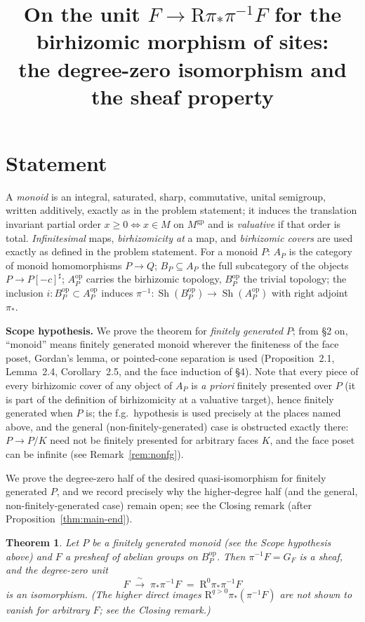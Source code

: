 \documentclass[11pt]{article}
\title{On the unit $F\to\mathrm{R}\pi_{*}\pi^{-1}F$ for the
birhizomic morphism of sites:\\
the degree-zero isomorphism and the sheaf property}
\author{}
\date{}
\newtheorem{theorem}{Theorem}[section]
\theoremstyle{definition}
\newcommand{\gp}{\mathrm{gp}}
\newcommand{\op}{\mathrm{op}}
\newcommand{\Sh}{\operatorname{Sh}}
\begin{document}
\maketitle

\section{Statement}\label{sec:intro}

A \emph{monoid} is an integral, saturated, sharp, commutative, unital
semigroup, written additively, exactly as in the problem statement; it
induces the translation invariant partial order $x\ge0\iff x\in M$ on
$M^{\gp}$ and is \emph{valuative} if that order is total.
\emph{Infinitesimal} maps, \emph{birhizomicity at} a map, and
\emph{birhizomic covers} are used exactly as defined in the problem
statement. For a monoid $P$: $A_P$ is the category of monoid
homomorphisms $P\to Q$; $B_P\subseteq A_P$ the full subcategory of the
objects $P\to P[-c]^{\sharp}$; $A_P^{\op}$ carries the birhizomic
topology, $B_P^{\op}$ the trivial topology; the inclusion
$i:B_P^{\op}\subset A_P^{\op}$ induces
$\pi^{-1}:\Sh(B_P^{\op})\to\Sh(A_P^{\op})$ with right adjoint $\pi_{*}$.

\noindent\textbf{Scope hypothesis.} We prove the theorem for
\emph{finitely generated} $P$; from \S2 on, ``monoid'' means
finitely generated monoid wherever the finiteness of the face poset,
Gordan's lemma, or pointed-cone separation is used (Proposition~2.1,
Lemma~2.4, Corollary~2.5, and the face induction of \S4). Note that
every piece of every birhizomic cover of any object of $A_P$ is
\emph{a priori} finitely presented over $P$ (it is part of the
definition of birhizomicity at a valuative target), hence finitely
generated when $P$ is; the f.g.\ hypothesis is used precisely at the
places named above, and the general (non-finitely-generated) case is
obstructed exactly there: $P\to P/K$ need not be finitely presented
for arbitrary faces $K$, and the face poset can be infinite (see
Remark~\ref{rem:nonfg}).

We prove the degree-zero half of the desired quasi-isomorphism for
finitely generated $P$, and we record precisely why the higher-degree
half (and the general, non-finitely-generated case) remain open; see
the Closing remark (after Proposition~\ref{thm:main-end}).

\begin{theorem}\label{thm:main}
Let $P$ be a \emph{finitely generated} monoid \textup{(}see the Scope
hypothesis above\textup{)} and $F$ a presheaf of abelian groups on
$B_P^{\op}$. Then $\pi^{-1}F=G_F$ is a sheaf, and the degree-zero
unit
\[
F\;\xrightarrow{\ \sim\ }\;\pi_{*}\pi^{-1}F
\;=\;\mathrm R^{0}\pi_{*}\pi^{-1}F
\]
is an isomorphism. \textup{(}The higher direct images
$\mathrm R^{q>0}\pi_{*}(\pi^{-1}F)$ are \emph{not} shown to vanish
for arbitrary $F$; see the Closing remark.\textup{)}
\end{theorem}
\end{document}
